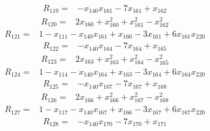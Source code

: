 \begin{equation*}\begin{split}
R_{119}={}&-x_{140} x_{161} - 7x_{161} + x_{162}
\end{split}\end{equation*}
\begin{equation*}\begin{split}
R_{120}={}&2x_{160} + x_{160}^{2} + x_{161}^{2} - x_{162}^{2}
\end{split}\end{equation*}
\begin{equation*}\begin{split}
R_{121}={}&1 - x_{111} - x_{140} x_{161} + x_{160} - 3x_{161} + 6x_{161} x_{220}
\end{split}\end{equation*}
\begin{equation*}\begin{split}
R_{122}={}&-x_{140} x_{164} - 7x_{164} + x_{165}
\end{split}\end{equation*}
\begin{equation*}\begin{split}
R_{123}={}&2x_{163} + x_{163}^{2} + x_{164}^{2} - x_{165}^{2}
\end{split}\end{equation*}
\begin{equation*}\begin{split}
R_{124}={}&1 - x_{114} - x_{140} x_{164} + x_{163} - 3x_{164} + 6x_{164} x_{220}
\end{split}\end{equation*}
\begin{equation*}\begin{split}
R_{125}={}&-x_{140} x_{167} - 7x_{167} + x_{168}
\end{split}\end{equation*}
\begin{equation*}\begin{split}
R_{126}={}&2x_{166} + x_{166}^{2} + x_{167}^{2} - x_{168}^{2}
\end{split}\end{equation*}
\begin{equation*}\begin{split}
R_{127}={}&1 - x_{117} - x_{140} x_{167} + x_{166} - 3x_{167} + 6x_{167} x_{220}
\end{split}\end{equation*}
\begin{equation*}\begin{split}
R_{128}={}&-x_{140} x_{170} - 7x_{170} + x_{171}
\end{split}\end{equation*}
